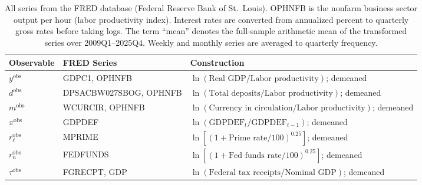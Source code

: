 \documentclass[]{article}
\begin{document}
\begin{table}[ht]
\centering
\begin{tabular}{ll p{6.5cm}}
\toprule 
Observable & FRED Series & Construction \\
\midrule
$y^\text{obs}$      & GDPC1, OPHNFB              &
    $\ln(\text{Real GDP}/\text{Labor productivity})$; demeaned \\[3pt]
$d^\text{obs}$      & DPSACBW027SBOG, OPHNFB     &
    $\ln(\text{Total deposits}/\text{Labor productivity})$; demeaned \\[3pt]
$m^\text{obs}$      & WCURCIR, OPHNFB             &
    $\ln(\text{Currency in circulation}/\text{Labor productivity})$; demeaned \\[3pt]
$\pi^\text{obs}$    & GDPDEF                      &
    $\ln(\text{GDPDEF}_t/\text{GDPDEF}_{t-1})$; demeaned \\[3pt]
$r_\ell^\text{obs}$ & MPRIME                      &
    $\ln[(1 + \text{Prime rate}/100)^{0.25}]$; demeaned \\[3pt]
$r_n^\text{obs}$    & FEDFUNDS                    &
    $\ln[(1 + \text{Fed funds rate}/100)^{0.25}]$; demeaned \\[3pt]
$\tau^\text{obs}$   & FGRECPT, GDP                &
    $\ln(\text{Federal tax receipts}/\text{Nominal GDP})$; demeaned \\
\bottomrule
\end{tabular}
\caption{All series from the FRED database (Federal Reserve Bank of St.\ Louis).  OPHNFB is the nonfarm business sector output per hour (labor productivity index).  Interest rates are converted from annualized percent to quarterly gross rates before taking logs.  The term ``mean'' denotes the full-sample arithmetic mean of the transformed series over 2009Q1--2025Q4.  Weekly and monthly series are averaged to quarterly frequency.}
\label{tab:data}
\end{table}
\end{document}
